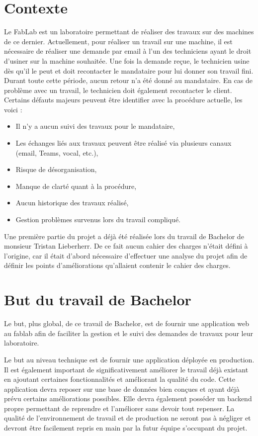 \documentclass[
    iai, %
    il, %
]{heig-tb}
\begin{document}
\section{Contexte}
Le FabLab est un laboratoire permettant de réaliser des travaux sur des machines de ce dernier. Actuellement, pour réaliser un travail sur une machine, il est nécessaire de réaliser une demande par email à l'un des techniciens ayant le droit d'usiner sur la machine souhaitée. Une fois la demande reçue, le technicien usine dès qu'il le peut et doit recontacter le mandataire pour lui donner son travail fini. Durant toute cette période, aucun retour n'a été donné au mandataire. En cas de problème avec un travail, le technicien doit également recontacter le client.
Certains défauts majeurs peuvent être identifier avec la procédure actuelle, les voici :
\begin{itemize}
    \item Il n'y a aucun suivi des travaux pour le mandataire, \cite{lieberherr}
    \item Les échanges liés aux travaux peuvent être réalisé via plusieurs canaux (email, Teams, vocal, etc.), \cite{lieberherr}
    \item Risque de désorganisation, \cite{lieberherr}
    \item Manque de clarté quant à la procédure, \cite{lieberherr}
    \item Aucun historique des travaux réalisé,
    \item Gestion problèmes survenus lors du travail compliqué.
\end{itemize}
Une première partie du projet a déjà été réalisée lors du travail de Bachelor de monsieur Tristan Lieberherr. De ce fait aucun cahier des charges n'était défini à l'origine, car il était d'abord nécessaire d'effectuer une analyse du projet afin de définir les points d'améliorations qu'allaient contenir le cahier des charges.

\section{But du travail de Bachelor}
Le but, plus global, de ce travail de Bachelor, est de fournir une application web au fablab afin de faciliter la gestion et le suivi des demandes de travaux pour leur laboratoire.

Le but au niveau technique est de fournir une application déployée en production.
Il est également important de significativement améliorer le travail déjà existant en ajoutant certaines fonctionnalités et améliorant la qualité du code. \newline
Cette application devra reposer sur une base de données bien conçues et ayant déjà prévu certains améliorations possibles. Elle devra également posséder un backend propre permettant de reprendre et l'améliorer sans devoir tout repenser. \newline
La qualité de l'environnement de travail et de production ne seront pas à négliger et devront être facilement repris en main par la futur équipe s'occupant du projet.
\end{document}
